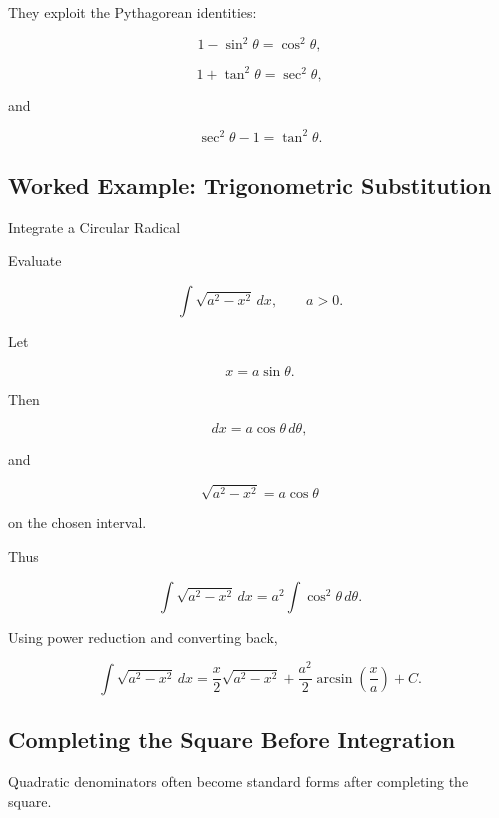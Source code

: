 They exploit the Pythagorean identities:

\[
\boxed{
1-\sin^2\theta
=
\cos^2\theta,
}
\]

\[
\boxed{
1+\tan^2\theta
=
\sec^2\theta,
}
\]

and

\[
\boxed{
\sec^2\theta-1
=
\tan^2\theta.
}
\]

\subsection{Worked Example: Trigonometric Substitution}
\label{subsec:worked-trig-substitution}

\begin{workedexamplebox}{Integrate a Circular Radical}

Evaluate

\[
\int
\sqrt{a^2-x^2}
\,dx,
\qquad
a>0.
\]

Let

\[
x=a\sin\theta.
\]

Then

\[
dx=a\cos\theta\,d\theta,
\]

and

\[
\sqrt{a^2-x^2}
=
a\cos\theta
\]

on the chosen interval.

Thus

\[
\int
\sqrt{a^2-x^2}
\,dx
=
a^2
\int
\cos^2\theta
\,d\theta.
\]

Using power reduction and converting back,

\begin{answerbox}
\[
\boxed{
\int
\sqrt{a^2-x^2}
\,dx
=
\frac{x}{2}
\sqrt{a^2-x^2}
+
\frac{a^2}{2}
\arcsin
\left(
\frac{x}{a}
\right)
+
C.
}
\]
\end{answerbox}

\end{workedexamplebox}

\subsection{Completing the Square Before Integration}
\label{subsec:complete-square-integral}

Quadratic denominators often become standard forms after completing the
square.


